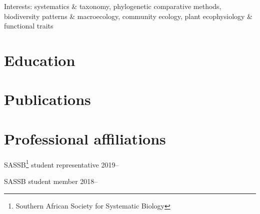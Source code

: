 \documentclass[10pt]{article}
\begin{document}


\bigskip

Interests:
  systematics \& taxonomy,
  phylogenetic comparative methods,
  biodiversity patterns \& macroecology,
  community ecology,
  plant ecophysiology \& functional traits





\section*{Education} %



\bigskip

\section*{Publications} %



\bigskip

\section*{Professional affiliations} %

SASSB\footnote{Southern African Society for Systematic Biology}
student representative                                    \hfill 2019--

SASSB student member                                               \hfill 2018--
\end{document}
